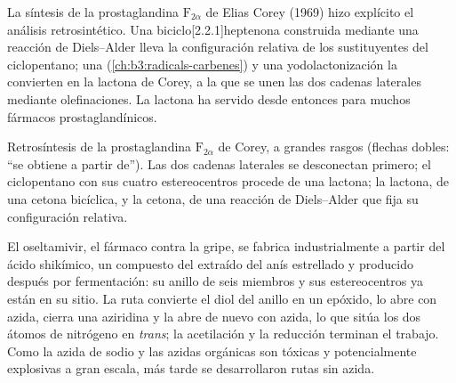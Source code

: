 La síntesis de la prostaglandina $\mathrm F_{2\alpha}$ de Elias Corey (1969) hizo explícito el análisis retrosintético.
Una biciclo[2.2.1]heptenona construida mediante una reacción de Diels--Alder lleva
la configuración relativa de los sustituyentes del ciclopentano; una
 (\cref{ch:b3:radicals-carbenes}) y una
yodolactonización la convierten en la lactona de Corey, a la que se unen las dos cadenas laterales
mediante olefinaciones. La lactona ha servido desde entonces para muchos fármacos
prostaglandínicos.

\begin{omfigure}

{\small Retrosíntesis de la prostaglandina $\mathrm F_{2\alpha}$ de Corey, a grandes rasgos (flechas dobles: ``se
obtiene a partir de''). Las dos cadenas laterales se desconectan primero; el ciclopentano con
sus cuatro estereocentros procede de una lactona; la lactona, de una cetona bicíclica,
y la cetona, de una reacción de Diels--Alder que fija su configuración
relativa.}
\end{omfigure}

El oseltamivir, el fármaco contra la gripe, se fabrica industrialmente a partir del ácido shikímico, un
compuesto del  extraído del anís estrellado y producido después por
fermentación: su anillo de seis miembros y sus estereocentros ya están en su sitio.
La ruta convierte el diol del anillo en un epóxido, lo abre con azida, cierra una
aziridina y la abre de nuevo con azida, lo que sitúa los dos átomos de nitrógeno
en \textit{trans}; la acetilación y la reducción terminan el trabajo. Como la azida de sodio y
las azidas orgánicas son tóxicas y potencialmente explosivas a gran escala, más tarde se desarrollaron
rutas sin azida.

